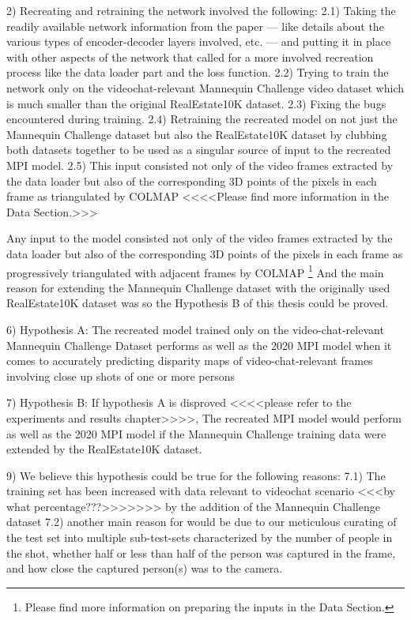 2) Recreating and retraining the network involved the following:
    2.1) Taking the readily available network information from the paper --- like details about the various types of encoder-decoder layers involved, etc. --- and putting it in place with other aspects of the network that called for a more involved recreation process like the data loader part and the loss function.
    2.2) Trying to train the network only on the videochat-relevant Mannequin Challenge video dataset which is much smaller than the original RealEstate10K dataset.
    2.3) Fixing the bugs encountered during training.
    2.4) Retraining the recreated model on not just the Mannequin Challenge dataset but also the RealEstate10K dataset by clubbing both datasets together to be used as a singular source of input to the recreated MPI model.
    2.5) This input consisted not only of the video frames extracted by the data loader but also of the corresponding 3D points of the pixels in each frame as triangulated by COLMAP <<<<Please find more information in the Data Section.>>> 

Any input to the model consisted not only of the video frames extracted by the data loader but also of the corresponding 3D points of the pixels in each frame as progressively triangulated with adjacent frames by COLMAP \footnote{Please find more information on preparing the inputs in the Data Section.}
And the main reason for extending the Mannequin Challenge dataset with the originally used RealEstate10K dataset was so the Hypothesis B of this thesis could be proved.


6) Hypothesis A: The recreated model trained only on the video-chat-relevant Mannequin Challenge Dataset performs as well as the 2020 MPI model when it comes to accurately predicting disparity maps of video-chat-relevant frames involving close up shots of one or more persons

7) Hypothesis B: If hypothesis A is disproved <<<<please refer to the experiments and results chapter>>>>, The recreated MPI model would perform as well as the 2020 MPI model if the Mannequin Challenge training data were extended by the RealEstate10K dataset.


9) We believe this hypothesis could be true for the following reasons: 
    7.1) The training set has been increased with data relevant to videochat scenario <<<by what percentage???>>>>>>> by the addition of the Mannequin Challenge dataset
    7.2) another main reason for would be due to our meticulous curating of the test set into multiple sub-test-sets characterized by the number of people in the shot, whether half or less than half of the person was captured in the frame, and how close the captured person(s) was to the camera.

